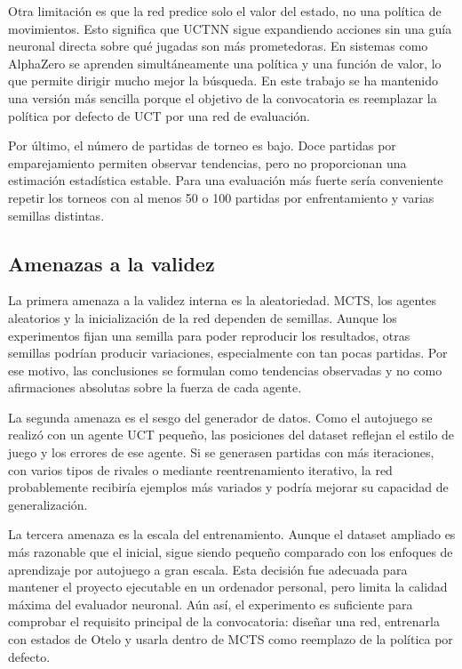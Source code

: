 \documentclass[conference,a4paper]{IEEEtran}
\begin{document}
Otra limitación es que la red predice solo el valor del estado, no una política
de movimientos. Esto significa que UCTNN sigue expandiendo acciones sin una guía
neuronal directa sobre qué jugadas son más prometedoras. En sistemas como
AlphaZero se aprenden simultáneamente una política y una función de valor, lo
que permite dirigir mucho mejor la búsqueda. En este trabajo se ha mantenido una
versión más sencilla porque el objetivo de la convocatoria es reemplazar la
política por defecto de UCT por una red de evaluación.

Por último, el número de partidas de torneo es bajo. Doce partidas por
emparejamiento permiten observar tendencias, pero no proporcionan una estimación
estadística estable. Para una evaluación más fuerte sería conveniente repetir
los torneos con al menos 50 o 100 partidas por enfrentamiento y varias semillas
distintas.

\subsection{Amenazas a la validez}

La primera amenaza a la validez interna es la aleatoriedad. MCTS, los agentes
aleatorios y la inicialización de la red dependen de semillas. Aunque los
experimentos fijan una semilla para poder reproducir los resultados, otras
semillas podrían producir variaciones, especialmente con tan pocas partidas. Por
ese motivo, las conclusiones se formulan como tendencias observadas y no como
afirmaciones absolutas sobre la fuerza de cada agente.

La segunda amenaza es el sesgo del generador de datos. Como el autojuego se
realizó con un agente UCT pequeño, las posiciones del dataset reflejan el estilo
de juego y los errores de ese agente. Si se generasen partidas con más
iteraciones, con varios tipos de rivales o mediante reentrenamiento iterativo,
la red probablemente recibiría ejemplos más variados y podría mejorar su
capacidad de generalización.

La tercera amenaza es la escala del entrenamiento. Aunque el dataset ampliado es
más razonable que el inicial, sigue siendo pequeño comparado con los enfoques de
aprendizaje por autojuego a gran escala. Esta decisión fue adecuada para mantener
el proyecto ejecutable en un ordenador personal, pero limita la calidad máxima
del evaluador neuronal. Aún así, el experimento es suficiente para comprobar el
requisito principal de la convocatoria: diseñar una red, entrenarla con estados
de Otelo y usarla dentro de MCTS como reemplazo de la política por defecto.
\end{document}
